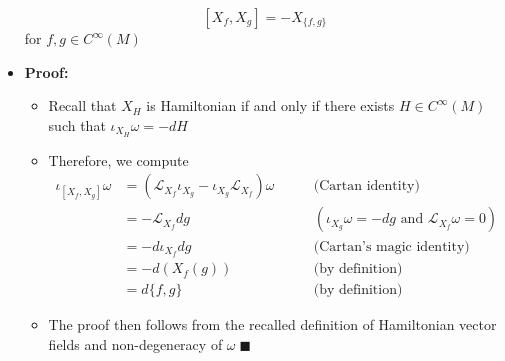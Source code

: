 \documentclass[12pt,a4paper]{article}
\numberwithin{equation}{section}
\begin{document}
\begin{itemize}
\begin{equation}
			\left[X_{f},X_{g}\right]=-X_{\{f,g\}}
		\end{equation}
		for $f,g \in C^{\infty}(M)$
		\item \textbf{Proof:}
		\begin{itemize}
			\item Recall that $X_{H}$ is Hamiltonian if and only if there exists $H\in C^{\infty}(M)$ such that $\iota_{X_{H}}\omega=-dH$
			\item Therefore, we compute
			\begin{equation}
				\begin{aligned}
					\iota_{\left[X_{f},X_{g}\right]}\omega&=\left(\mathcal{L}_{X_{f}}\iota_{X_{g}}-\iota_{X_{g}}\mathcal{L}_{X_{f}}\right)\omega \qquad&\text{(Cartan identity)}\\
					&=-\mathcal{L}_{X_{f}}dg\qquad&(\iota_{X_{g}}\omega=-dg \text{ and } \mathcal{L}_{X_{f}}\omega=0)\\&=-d\iota_{X_{f}}dg\qquad&\text{(Cartan's magic identity)}\\&=-d\left(X_{f}(g)\right)\qquad&\text{(by definition)}\\&=d\{f,g\}\qquad&\text{(by definition)}
				\end{aligned}
			\end{equation}
			\item The proof then follows from the recalled definition of Hamiltonian vector fields and non-degeneracy of $\omega\;\blacksquare$
		\end{itemize}
	\end{itemize}
\end{document}
